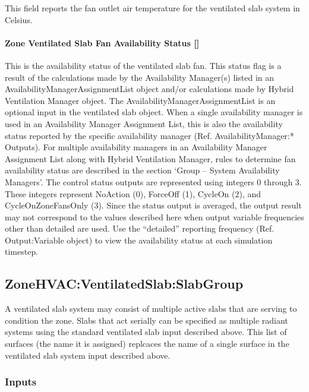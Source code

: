 This field reports the fan outlet air temperature for the ventilated slab system in Celsius.

\paragraph{Zone Ventilated Slab Fan Availability Status {[]}}\label{zone-ventilated-slab-fan-availability-status}

This is the availability status of the ventilated slab fan. This status flag is a result of the calculations made by the Availability Manager(s) listed in an AvailabilityManagerAssignmentList object and/or calculations made by Hybrid Ventilation Manager object. The AvailabilityManagerAssignmentList is an optional input in the ventilated slab object. When a single availability manager is used in an Availability Manager Assignment List, this is also the availability status reported by the specific availability manager (Ref. AvailabilityManager:* Outputs). For multiple availability managers in an Availability Manager Assignment List along with Hybrid Ventilation Manager, rules to determine fan availability status are described in the section `Group -- System Availability Managers'. The control status outputs are represented using integers 0 through 3. These integers represent NoAction (0), ForceOff (1), CycleOn (2), and CycleOnZoneFansOnly (3). Since the status output is averaged, the output result may not correspond to the values described here when output variable frequencies other than detailed are used. Use the ``detailed'' reporting frequency (Ref. Output:Variable object) to view the availability status at each simulation timestep.

\subsection{ZoneHVAC:VentilatedSlab:SlabGroup}\label{zonehvacventilatedslabslabgroup}

A ventilated slab system may consist of multiple active slabs that are serving to condition the zone. Slabs that act serially can be specified as multiple radiant systems using the standard ventilated slab input described above. This list of surfaces (the name it is assigned) replcaces the name of a single surface in the ventilated slab system input described above.

\subsubsection{Inputs}\label{inputs-11-013}

